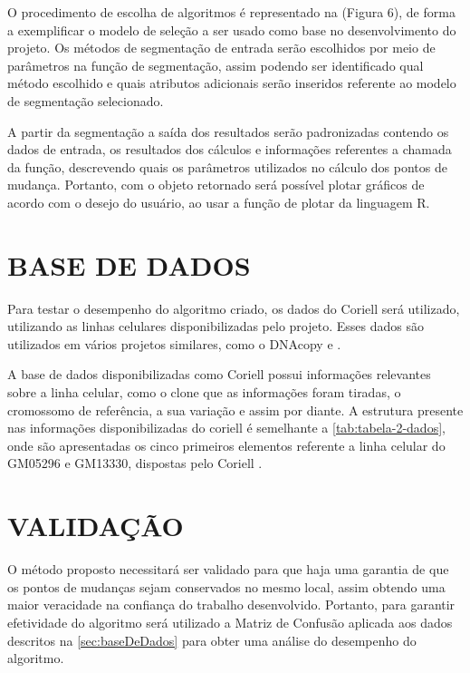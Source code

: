 O procedimento de escolha de algoritmos é representado na (Figura 6), de forma a exemplificar o modelo de seleção a ser usado como base no desenvolvimento do projeto. Os métodos de segmentação de entrada serão escolhidos por meio de parâmetros na função de segmentação, assim podendo ser identificado qual método escolhido e quais atributos adicionais serão inseridos referente ao modelo de segmentação selecionado. 

A partir da segmentação a saída dos resultados serão padronizadas contendo os dados de entrada, os resultados dos cálculos e informações referentes a chamada da função, descrevendo quais os parâmetros utilizados no cálculo dos pontos de mudança. Portanto, com o objeto retornado será possível plotar gráficos de acordo com o desejo do usuário, ao usar a função de plotar da linguagem R. 

\section{BASE DE DADOS} 
\label{sec:baseDeDados} 

Para testar o desempenho do algoritmo criado, os dados do Coriell \cite{Snijders2001} será utilizado, utilizando as linhas celulares disponibilizadas pelo projeto. Esses dados são utilizados em vários projetos similares, como o DNAcopy \cite{Olshen2004} e \cite{Girimurugan2018}. 

A base de dados disponibilizadas como Coriell possui informações relevantes sobre a linha celular, como o clone que as informações foram tiradas, o cromossomo de referência, a sua variação e assim por diante. A estrutura presente nas informações disponibilizadas do coriell é semelhante a \autoref{tab:tabela-2-dados}, onde são apresentadas os cinco primeiros elementos referente a linha celular do GM05296 e GM13330, dispostas pelo Coriell \cite{Snijders2001}. 

 

\section{VALIDAÇÃO} 

O método proposto necessitará ser validado para que haja uma garantia de que os pontos de mudanças sejam conservados no mesmo local, assim obtendo uma maior veracidade na confiança do trabalho desenvolvido. Portanto, para garantir efetividade do algoritmo será utilizado a Matriz de Confusão aplicada aos dados descritos na \autoref{sec:baseDeDados} para obter uma análise do desempenho do algoritmo.